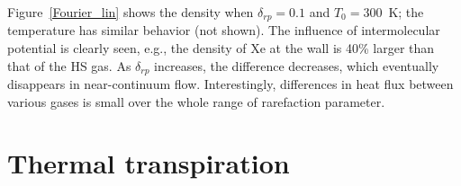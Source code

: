 

Figure~\ref{Fourier_lin} shows the density when $\delta_{rp}=0.1$ and $T_0=300$~K; the temperature has similar behavior (not shown). The influence of intermolecular potential is clearly seen, e.g., the density of Xe at the wall is 40\% larger than that of the HS gas. As $\delta_{rp}$ increases, the difference decreases, which eventually disappears in near-continuum flow.  Interestingly, differences in heat flux between various gases is small over the whole range of rarefaction parameter.



\section{Thermal transpiration}\label{poiseuille_dis}





